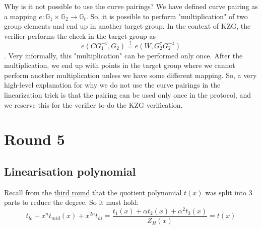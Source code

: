Why is it not possible to use the curve pairings? We have defined curve pairing as a mapping $e: \mathbb{G}_1 \times \mathbb{G}_2 \rightarrow \mathbb{G}_t$. So, it is possible to perform "multiplication" of two group elements and end up in another target group. In the context of KZG, the verifier performs the check in the target group as $$e(C G_1^{-v}, G_2) \stackrel{?}{=} e(W, G_2^{\tau}G_2^{-z})$$. Very informally, this "multiplication" can be performed only once. After the multiplication, we end up with points in the target group where we cannot perform another multiplication unless we have some different mapping. So, a very high-level explanation for why we do not use the curve pairings in the linearization trick is that the pairing can be used only once in the protocol, and we reserve this for the verifier to do the KZG verification.



\section{Round 5}
\label{chap:round5}


\subsection{Linearisation polynomial}
Recall from the \hyperref[chap:round3]{third round} that the quotient polynomial $t(x)$ was split into 3 parts to reduce the degree. So it must hold: $$t_{lo} + x^{n}t_{mid}(x) + x^{2n}t_{hi} = \frac{t_1(x) + \alpha t_2(x) + \alpha^2t_3(x)}{Z_H(x)} = t(x)$$

